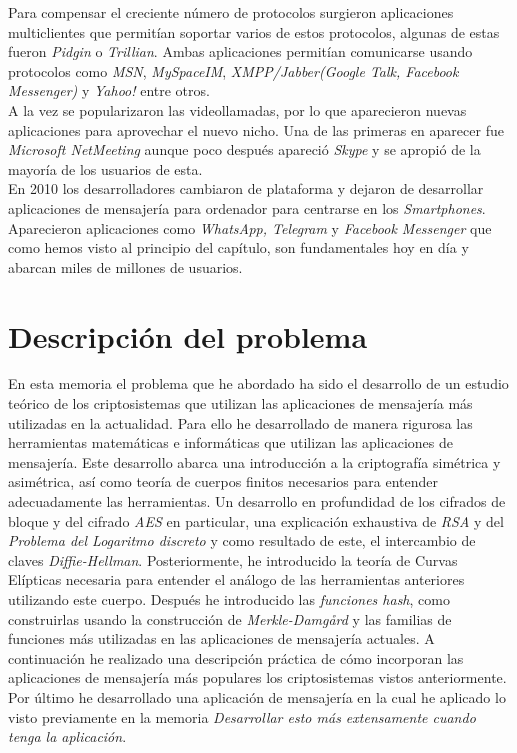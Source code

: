 Para compensar el creciente número de protocolos surgieron aplicaciones multiclientes que permitían soportar varios de estos protocolos, algunas de estas fueron \emph{Pidgin} o \emph{Trillian}. Ambas aplicaciones permitían comunicarse usando protocolos como \emph{MSN}, \emph{MySpaceIM}, \emph{XMPP/Jabber(Google Talk, Facebook Messenger)} y \emph{Yahoo!} entre otros.\\ 
A la vez se popularizaron las videollamadas, por lo que aparecieron nuevas aplicaciones para aprovechar el nuevo nicho. Una de las primeras en aparecer fue \emph{Microsoft NetMeeting} aunque poco después apareció \emph{Skype} y se apropió de la mayoría de los usuarios de esta.\\
En 2010 los desarrolladores cambiaron de plataforma y dejaron de desarrollar aplicaciones de mensajería para ordenador para centrarse en los \emph{Smartphones}. Aparecieron aplicaciones como \emph{WhatsApp, Telegram} y \emph{Facebook Messenger} que como hemos visto al principio del capítulo, son fundamentales hoy en día y abarcan miles de millones de usuarios.

\section{Descripción del problema}
En esta memoria el problema que he abordado ha sido el desarrollo de un estudio teórico de los criptosistemas que utilizan las aplicaciones de mensajería más utilizadas en la actualidad. Para ello he desarrollado de manera rigurosa las herramientas matemáticas e informáticas que utilizan las aplicaciones de mensajería. Este desarrollo abarca una introducción a la criptografía simétrica y asimétrica, así como teoría de cuerpos finitos necesarios para entender adecuadamente las herramientas.
Un desarrollo en profundidad de los cifrados de bloque y del cifrado \emph{AES} en particular, una explicación exhaustiva de \emph{RSA} y del \emph{Problema del Logaritmo discreto} y como resultado de este, el intercambio de claves \emph{Diffie-Hellman}. Posteriormente, he introducido la teoría de Curvas Elípticas necesaria para entender el análogo de las herramientas anteriores utilizando este cuerpo.
Después he introducido las \emph{funciones hash}, como construirlas usando la construcción de \emph{Merkle-Damgård} y las familias de funciones más utilizadas en las aplicaciones de mensajería actuales. A continuación he realizado una descripción práctica de cómo incorporan las aplicaciones de mensajería más populares los criptosistemas vistos anteriormente. Por último he desarrollado una aplicación de mensajería en la cual he aplicado lo visto previamente en la memoria \emph{Desarrollar esto más extensamente cuando tenga la aplicación}. 

